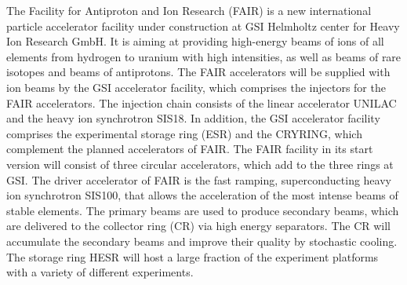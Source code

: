 The Facility for Antiproton and Ion Research (FAIR) is a new international particle accelerator facility under construction at GSI Helmholtz center for Heavy Ion Research GmbH. It is aiming at providing high-energy beams of ions of all elements from hydrogen to uranium with high intensities, as well as beams of rare isotopes and beams of antiprotons. The FAIR accelerators will be supplied with ion beams by the GSI accelerator facility, which comprises the injectors for the FAIR accelerators. The injection chain consists of the linear accelerator UNILAC and the heavy ion synchrotron SIS18. In addition, the GSI accelerator facility comprises the experimental storage ring (ESR) and the CRYRING, which complement the planned accelerators of FAIR. The FAIR facility in its start version will consist of three circular accelerators, which add to the three rings at GSI. The driver accelerator of FAIR is the fast ramping, superconducting heavy ion synchrotron SIS100, that allows the acceleration of the most intense beams of stable elements. The primary beams are used to produce secondary beams, which are delivered to the collector ring (CR) via high energy separators. The CR will accumulate the secondary beams and improve their quality by stochastic cooling. The storage ring HESR will host a large fraction of the experiment platforms with a variety of different experiments. 

